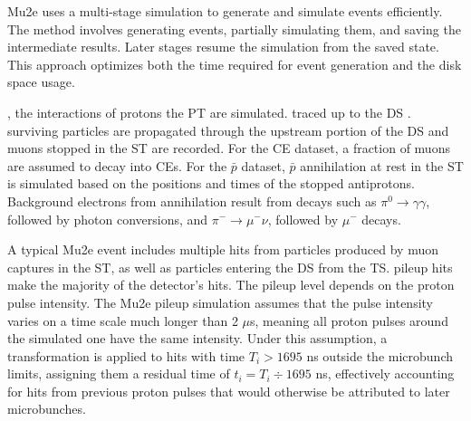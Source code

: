 Mu2e uses a multi-stage simulation to generate and simulate events efficiently. 
The method involves generating events, partially simulating 
them, and saving the intermediate results. Later stages resume the simulation from the saved 
state. This approach optimizes both the time required for  event generation 
and the disk space usage. 

, the interactions of protons  the PT are simulated.
 traced
up to the DS .
 surviving particles are propagated through the upstream portion of
the DS and muons stopped in the ST are recorded.
For the CE dataset, a fraction of muons are assumed to decay into CEs. For the $\bar{p}$ dataset, 
$\bar{p}$ annihilation at rest in the ST is simulated based on the positions 
and times of the stopped antiprotons. Background electrons from annihilation 
result from decays such as $\pi^0 \to \gamma \gamma$, followed by photon conversions, and $\pi^- \to \mu^- \nu$, 
followed by $\mu^-$ decays. 


A typical Mu2e event includes multiple  hits from particles produced 
by muon captures in the ST, as well as particles entering the DS from 
the TS.  pileup hits make 
 the majority of the detector's hits. The pileup level 
depends on the proton pulse intensity. The Mu2e pileup 
simulation assumes that the pulse intensity varies on a 
time scale much longer than 2 $\mu$s, meaning all proton 
pulses around the simulated one have the same intensity. 
Under this assumption, a transformation is applied to hits 
with time $T_i > 1695$ ns outside the microbunch limits, 
assigning them a residual time of $t_i = T_i \div 1695$ ns, 
effectively accounting for hits from previous proton pulses 
that would otherwise be attributed to later microbunches.

